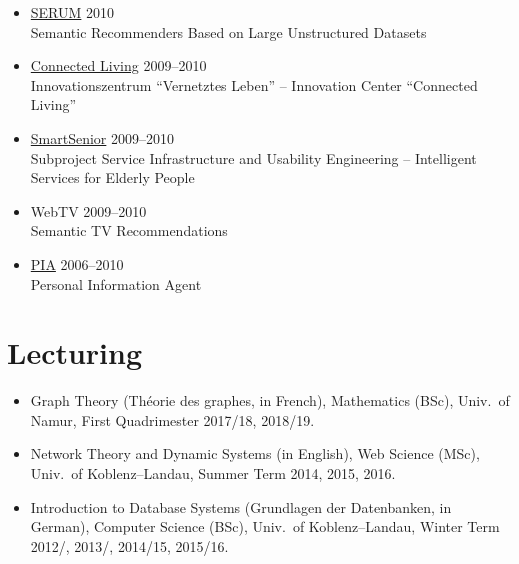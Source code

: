\documentclass[line,mm]{res}
\newcounter{y}
\newcounter{z}
\begin{document}
\begin{resume}
\begin{itemize}
\item \href{http://www.dai-labor.de/en/irml/serum/}{SERUM} \hfill 2010 \\
  Semantic Recommenders Based on Large Unstructured Datasets
\item \href{http://www.connected-living.org/}{Connected Living} \hfill 2009--2010 \\
   Innovationszentrum ``Vernetztes Leben'' -- Innovation Center ``Connected Living''
\item \href{http://www1.smart-senior.de/}{SmartSenior} \hfill 2009--2010 \\
  Subproject Service Infrastructure and Usability Engineering -- Intelligent Services for Elderly People
\item WebTV \hfill 2009--2010 \\
  Semantic TV Recommendations
\item \href{http://pia-services.de/}{PIA} \hfill 2006--2010 \\
  Personal Information Agent 
\end{itemize}

\section{Lecturing}
\begin{itemize}
\item Graph Theory (Théorie des graphes, in French), Mathematics (BSc),
  Univ.\ of Namur, First Quadrimester 2017/18, 2018/19.   
\item Network Theory and Dynamic Systems (in English), Web Science (MSc), Univ.\ of
  Koblenz--Landau, Summer Term 2014, 2015, 2016.   
\item Introduction to Database Systems (Grundlagen der Datenbanken, in
  German), Computer Science (BSc), Univ.\ of Koblenz--Lan\-dau, 
  Winter Term 2012/, 2013/, 2014/15, 2015/16.
\end{itemize}


\end{resume}
\end{document}
